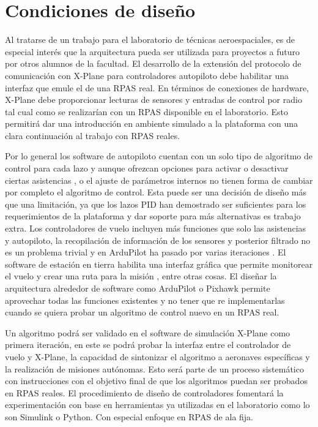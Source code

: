 \section{Condiciones de diseño}

Al tratarse de un trabajo para el laboratorio de técnicas aeroespaciales, es de especial interés que la arquitectura pueda ser utilizada para proyectos a futuro por otros alumnos de la facultad. El desarrollo de la extensión del protocolo de comunicación con X-Plane para controladores autopiloto debe habilitar una interfaz que emule el de una RPAS real. En términos de conexiones de hardware, X-Plane debe proporcionar lecturas de sensores y entradas de control por radio tal cual como se realizarían con un RPAS disponible en el laboratorio. Esto permitirá dar una introducción en ambiente simulado a la plataforma con una clara continuación al trabajo con RPAS reales.

Por lo general los software de autopiloto cuentan con un solo tipo de algoritmo de control para cada lazo y aunque ofrezcan opciones para activar o desactivar ciertas asistencias \cite{ardupilot-flight-modes}, o el ajuste de parámetros internos \cite{ardupilot-plane-tuning} no tienen forma de cambiar por completo el algoritmo de control. Esta puede ser una decisión de diseño más que una limitación, ya que los lazos PID han demostrado ser suficientes para los requerimientos de la plataforma y dar soporte para más alternativas es trabajo extra. Los controladores de vuelo incluyen más funciones que solo las asistencias y autopiloto, la recopilación de información de los sensores y posterior filtrado no es un problema trivial y en ArduPilot ha pasado por varias iteraciones \cite{ardupilot-ekf}. El software de estación en tierra habilita una interfaz gráfica que permite monitorear el vuelo y crear una ruta para la misión \cite{ardupilot-gs}, entre otras cosas. El diseñar la arquitectura alrededor de software como ArduPilot o Pixhawk permite aprovechar todas las funciones existentes y no tener que re implementarlas cuando se quiera probar un algoritmo de control nuevo en un RPAS real.

Un algoritmo podrá ser validado en el software de simulación X-Plane como primera iteración, en este se podrá probar la interfaz entre el controlador de vuelo y X-Plane, la capacidad de sintonizar el algoritmo a aeronaves específicas y la realización de misiones autónomas. Esto será parte de un proceso sistemático con instrucciones con el objetivo final de que los algoritmos puedan ser probados en RPAS reales. El procedimiento de diseño de controladores fomentará la experimentación con base en herramientas ya utilizadas en el laboratorio como lo son Simulink o Python. Con especial enfoque en RPAS de ala fija.

